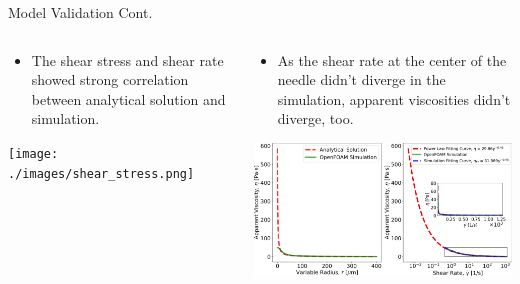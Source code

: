 \begin{frame}{Model Validation Cont.}

\begin{columns}
\begin{column}{.5\textwidth}

\begin{itemize}
    \item The shear stress and shear rate showed strong correlation between analytical solution and simulation.
\end{itemize}
\vspace{3mm}
\centering
\texttt{[image: ./images/shear\_stress.png]}
\end{column}

\begin{column}{.5\textwidth}
\begin{itemize}
    \item As the shear rate at the center of the needle didn't diverge in the simulation, apparent viscosities didn't diverge, too.
\end{itemize}
\vspace{3mm}
\centering
\includegraphics[trim = 0mm 0mm 0mm 0mm, clip, width=3.07in]{./images/apparent_viscosity.png}
\end{column}
\end{columns}

\end{frame}


